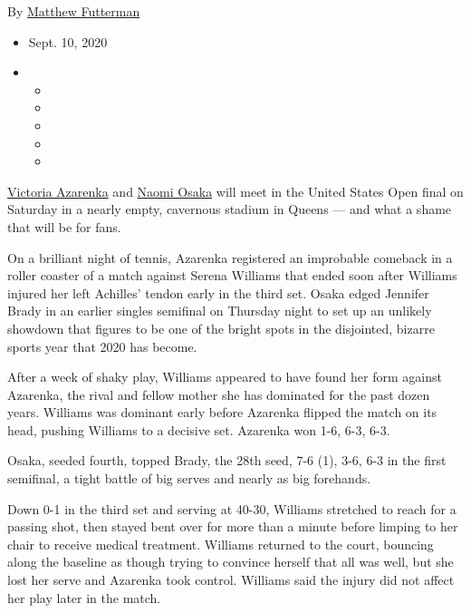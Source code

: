By
\href{https://www.nytimes3xbfgragh.onion/by/matthew-futterman}{Matthew
Futterman}

\begin{itemize}
\item
  Sept. 10, 2020
\item
  \begin{itemize}
  \item
  \item
  \item
  \item
  \item
  \end{itemize}
\end{itemize}

\href{https://www.nytimes3xbfgragh.onion/2020/09/09/sports/tennis/belarus-tennis-azarenka-lukashenko.html}{Victoria
Azarenka} and
\href{https://www.nytimes3xbfgragh.onion/2020/09/03/sports/naomi-osaka-is-steadfast-in-winning-and-her-message.html}{Naomi
Osaka} will meet in the United States Open final on Saturday in a nearly
empty, cavernous stadium in Queens --- and what a shame that will be for
fans.

On a brilliant night of tennis, Azarenka registered an improbable
comeback in a roller coaster of a match against Serena Williams that
ended soon after Williams injured her left Achilles' tendon early in the
third set. Osaka edged Jennifer Brady in an earlier singles semifinal on
Thursday night to set up an unlikely showdown that figures to be one of
the bright spots in the disjointed, bizarre sports year that 2020 has
become.

After a week of shaky play, Williams appeared to have found her form
against Azarenka, the rival and fellow mother she has dominated for the
past dozen years. Williams was dominant early before Azarenka flipped
the match on its head, pushing Williams to a decisive set. Azarenka won
1-6, 6-3, 6-3.

Osaka, seeded fourth, topped Brady, the 28th seed, 7-6 (1), 3-6, 6-3 in
the first semifinal, a tight battle of big serves and nearly as big
forehands.

Down 0-1 in the third set and serving at 40-30, Williams stretched to
reach for a passing shot, then stayed bent over for more than a minute
before limping to her chair to receive medical treatment. Williams
returned to the court, bouncing along the baseline as though trying to
convince herself that all was well, but she lost her serve and Azarenka
took control. Williams said the injury did not affect her play later in
the match.

